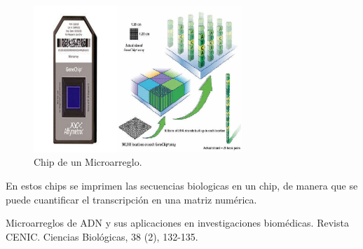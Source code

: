 \documentclass[12pt,letterpaper]{article}
\begin{document}
\begin{figure}[H]
\begin{center}
\includegraphics[width=0.7\textwidth]{Genechip.png}
\end{center}
\caption{Chip de un Microarreglo.}
\end{figure}
En estos chips se imprimen las secuencias biologicas en un chip, de manera que se puede cuantificar el transcripción en una matriz numérica.	


\begin{thebibliography}{XXX0000}
   Microarreglos de ADN y sus aplicaciones en investigaciones biomédicas. Revista CENIC. Ciencias Biológicas, 38 (2), 132-135. 
\end{thebibliography} 	
\end{document}
